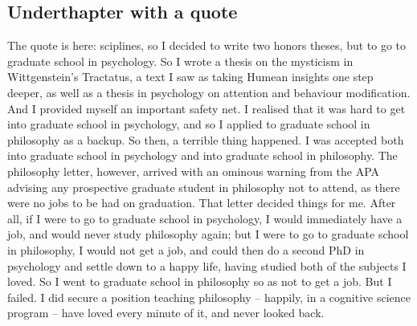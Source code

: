 \documentclass[article,letterpaper,times,12pt,listings-bw,microtype]{memoir}
\begin{document}
\subsection{Underthapter with a quote}
\label{sec-1-1}

The quote is here: sciplines, so I decided to write two honors theses, but to go to graduate school in psychology. So I wrote a thesis on the mysticism in Wittgenstein’s Tractatus, a text I saw as taking Humean insights one step deeper, as well as a thesis in psychology on attention and behaviour modification. And I provided myself an important safety net. I realised that it was hard to get into graduate school in psychology, and so I applied to graduate school in philosophy as a backup. So then, a terrible thing happened. I was accepted both into graduate school in psychology and into graduate school in philosophy. The philosophy letter, however, arrived with an ominous warning from the APA advising any prospective graduate student in philosophy not to attend, as there were no jobs to be had on graduation. That letter decided things for me. After all, if I were to go to graduate school in psychology, I would immediately have a job, and would never study philosophy again; but I were to go to graduate school in philosophy, I would not get a job, and could then do a second PhD in psychology and settle down to a happy life, having studied both of the subjects I loved. So I went to graduate school in philosophy so as not to get a job. But I failed. I did secure a position teaching philosophy – happily, in a cognitive science program – have loved every minute of it, and never looked back.
\end{document}

